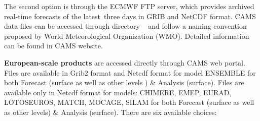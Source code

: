 \documentclass[9pt]{report}
\begin{document}
The second option is through the ECMWF FTP server, which provides archived real-time forecasts of the latest three days in GRIB and NetCDF format.
CAMS data files can be accessed through directory ~ and follow a naming convention proposed by World Meteorological Organization (WMO).
Detailed information can be found in CAMS website.%

\mdbr
{}\textbf{European-scale products} are accessed directly through CAMS web portal. Files are available in Grib2 format and Netcdf format for model ENSEMBLE for both Forecast (surface as well as other levels ) \& Analysis (surface).
Files are available only in Netcdf format for models: CHIMERE, EMEP, EURAD, LOTOSEUROS, MATCH, MOCAGE, SILAM for both Forecast (surface as well as other levels) \& Analysis (surface).
There are six available choices:%
\end{document}
